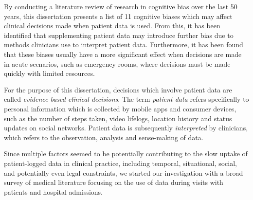 \documentclass{sigchi}
\begin{document}
By conducting a literature review of research in cognitive bias over the last 50 years, this dissertation presents a list of 11 cognitive biases which may affect clinical decisions made when patient data is used. From this, it has been identified that supplementing patient data may introduce further bias due to methods clinicians use to interpret patient data. Furthermore, it has been found that these biases usually have a more significant effect when decisions are made in acute scenarios, such as emergency rooms, where decisions must be made quickly with limited resources.

For the purpose of this dissertation, decisions which involve patient data are called \textit{evidence-based clinical decisions}. The term \textit{patient data} refers specifically to personal information which is collected by mobile apps and consumer devices, such as the number of steps taken, video lifelogs, location history and status updates on social networks. Patient data is subsequently \textit{interpreted} by clinicians, which refers to the observation, analysis and sense-making of data.


Since multiple factors seemed to be potentially contributing to the slow uptake of patient-logged data in clinical practice, including temporal, situational, social, and potentially even legal constraints, we started our investigation with a broad survey of medical literature focusing on the use of data during visits with patients and hospital admissions.  


\end{document}
